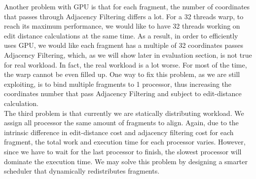 Another problem with GPU is that for each fragment, the number of coordinates
that passes through Adjacency Filtering differs a lot. For a 32 threads warp,
to reach its maximum performance, we would like to have 32 threads working on
edit distance calculations at the same time. As a result, in order to
efficiently uses GPU, we would like each fragment has a multiple of 32
coordinates passes Adjacency Filtering, which, as we will show later in
evaluation section, is not true for real workload. In fact, the real workload
is a lot worse. For most of the time, the warp cannot be even filled up. One
way to fix this problem, as we are still exploiting, is to bind multiple
fragments to 1 processor, thus increasing the coordinates number that pass
Adjacency Filtering and subject to edit-distance calculation. \\

The third problem is that currently we are statically distributing workload. We
assign all processor the same amount of fragments to align. Again, due to the
intrinsic difference in edit-distance cost and adjacency filtering cost for
each fragment, the total work and execution time for each processor varies.
However, since we have to wait for the last processor to finish, the slowest
processor will dominate the execution time. We may solve this problem by
designing a smarter scheduler that dynamically redistributes fragments.\\

